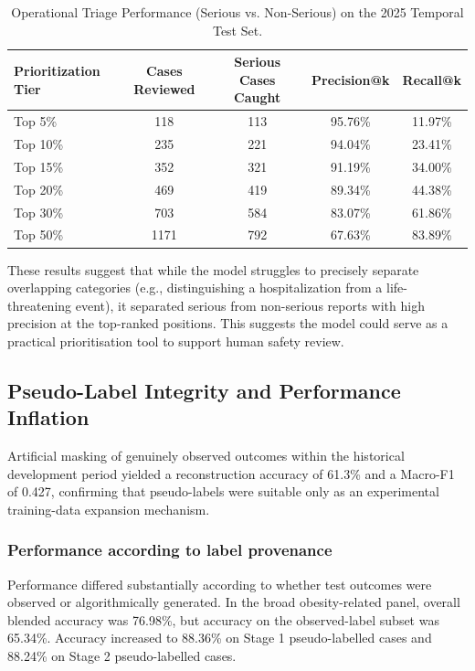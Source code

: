 \documentclass[10pt]{article}
\begin{document}
\begin{table}[htbp]
\centering
\caption{Operational Triage Performance (Serious vs. Non-Serious) on the 2025 Temporal Test Set.}
\label{tab:triage_metrics}
\begin{tabular}{|l|c|c|c|c|}
\hline
\textbf{Prioritization Tier} & \textbf{Cases Reviewed} & \textbf{Serious Cases Caught} & \textbf{Precision@k} & \textbf{Recall@k} \\
\hline
Top 5\%  & 118 & 113 & 95.76\% & 11.97\% \\
Top 10\% & 235 & 221 & 94.04\% & 23.41\% \\
Top 15\% & 352 & 321 & 91.19\% & 34.00\% \\
Top 20\% & 469 & 419 & 89.34\% & 44.38\% \\
Top 30\% & 703 & 584 & 83.07\% & 61.86\% \\
Top 50\% & 1171 & 792 & 67.63\% & 83.89\% \\
\hline
\end{tabular}
\end{table}

These results suggest that while the model struggles to precisely separate overlapping categories (e.g., distinguishing a hospitalization from a life-threatening event), it separated serious from non-serious reports with high precision at the top-ranked positions. This suggests the model could serve as a practical prioritisation tool to support human safety review.

\subsection{Pseudo-Label Integrity and Performance Inflation}
Artificial masking of genuinely observed outcomes within the historical development period yielded a reconstruction accuracy of 61.3\% and a Macro-F1 of 0.427, confirming that pseudo-labels were suitable only as an experimental training-data expansion mechanism.

\subsubsection{Performance according to label provenance}
Performance differed substantially according to whether test outcomes were observed or algorithmically generated. In the broad obesity-related panel, overall blended accuracy was 76.98\%, but accuracy on the observed-label subset was 65.34\%. Accuracy increased to 88.36\% on Stage 1 pseudo-labelled cases and 88.24\% on Stage 2 pseudo-labelled cases.
\end{document}
